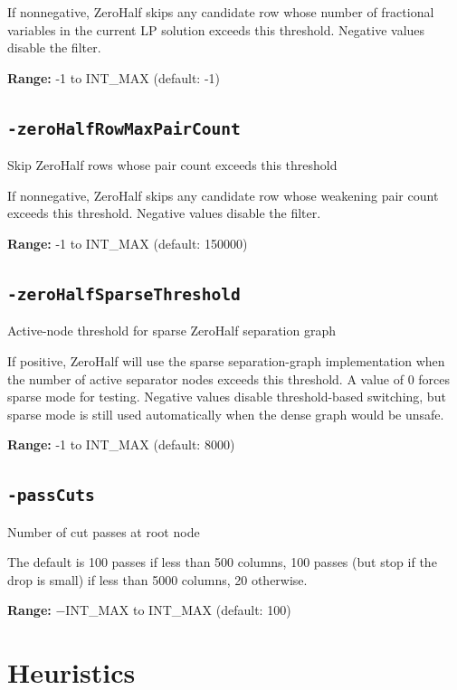 \documentclass[11pt,a4paper]{article}
\begin{document}
If nonnegative, ZeroHalf skips any candidate row whose number of fractional variables in the current LP solution exceeds this threshold. Negative values disable the filter.

\textbf{Range:} -1 to INT\_MAX (default: -1)

\subsection*{\texttt{-zeroHalfRowMaxPairCount}}

Skip ZeroHalf rows whose pair count exceeds this threshold

If nonnegative, ZeroHalf skips any candidate row whose weakening pair count exceeds this threshold. Negative values disable the filter.

\textbf{Range:} -1 to INT\_MAX (default: 150000)

\subsection*{\texttt{-zeroHalfSparseThreshold}}

Active-node threshold for sparse ZeroHalf separation graph

If positive, ZeroHalf will use the sparse separation-graph implementation when the number of active separator nodes exceeds this threshold. A value of 0 forces sparse mode for testing. Negative values disable threshold-based switching, but sparse mode is still used automatically when the dense graph would be unsafe.

\textbf{Range:} -1 to INT\_MAX (default: 8000)

\subsection*{\texttt{-passCuts}}

Number of cut passes at root node

The default is 100 passes if less than 500 columns, 100 passes (but stop if the drop is small) if less than 5000 columns, 20 otherwise.

\textbf{Range:} $-$INT\_MAX to INT\_MAX (default: 100)

\section{Heuristics}
\end{document}
